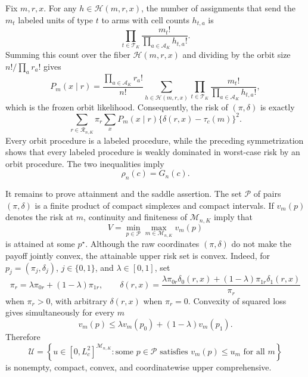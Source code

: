 Fix \(m,r,x\).  For any \(h\in\mathcal H(m,r,x)\), the number of assignments that send the \(m_t\) labeled units of type \(t\) to arms with cell counts \(h_{t,a}\) is
\[
 \prod_{t\in\mathcal T_K}\frac{m_t!}{\prod_{a\in\mathcal A_K}h_{t,a}!}.
\]
Summing this count over the fiber \(\mathcal H(m,r,x)\) and dividing by the orbit size \(n!/\prod_a r_a!\) gives
\[
 P_m(x\mid r)=\frac{\prod_{a\in\mathcal A_K}r_a!}{n!}
 \sum_{h\in\mathcal H(m,r,x)}
 \prod_{t\in\mathcal T_K}\frac{m_t!}{\prod_{a\in\mathcal A_K}h_{t,a}!},
\]
which is the frozen orbit likelihood.  Consequently, the risk of \((\pi,\delta)\) is exactly
\[
 \sum_{r\in\mathcal R_{n,K}}\pi_r
 \sum_xP_m(x\mid r)\{\delta(r,x)-\tau_c(m)\}^2.
\]
Every orbit procedure is a labeled procedure, while the preceding symmetrization shows that every labeled procedure is weakly dominated in worst-case risk by an orbit procedure.  The two inequalities imply
\[
 \rho_n(c)=G_n(c).
\]

It remains to prove attainment and the saddle assertion.  The set \(\mathscr P\) of pairs \((\pi,\delta)\) is a finite product of compact simplexes and compact intervals.  If \(v_m(p)\) denotes the risk at \(m\), continuity and finiteness of \(\mathcal M_{n,K}\) imply that
\[
 V=\min_{p\in\mathscr P}\max_{m\in\mathcal M_{n,K}}v_m(p)
\]
is attained at some \(p^\star\).  Although the raw coordinates \((\pi,\delta)\) do not make the payoff jointly convex, the attainable upper risk set is convex.  Indeed, for \(p_j=(\pi_j,\delta_j)\), \(j\in\{0,1\}\), and \(\lambda\in[0,1]\), set
\[
 \pi_r=\lambda\pi_{0r}+(1-\lambda)\pi_{1r},
 \qquad
 \delta(r,x)=
 \frac{\lambda\pi_{0r}\delta_0(r,x)+(1-\lambda)\pi_{1r}\delta_1(r,x)}{\pi_r}
\]
when \(\pi_r>0\), with arbitrary \(\delta(r,x)\) when \(\pi_r=0\).  Convexity of squared loss gives simultaneously for every \(m\)
\[
 v_m(p)\le\lambda v_m(p_0)+(1-\lambda)v_m(p_1).
\]
Therefore
\[
 \mathcal U=\left\{u\in[0,L_c^2]^{\mathcal M_{n,K}}:
 \text{some }p\in\mathscr P\text{ satisfies }v_m(p)\le u_m
 \text{ for all }m\right\}
\]
is nonempty, compact, convex, and coordinatewise upper comprehensive.

